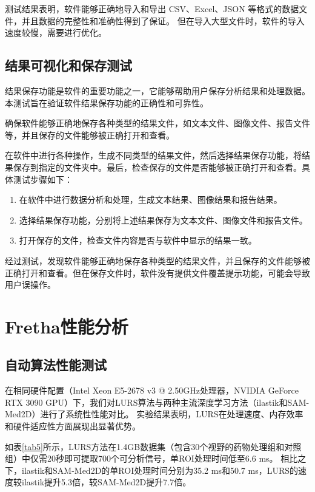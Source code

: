 测试结果表明，软件能够正确地导入和导出 CSV、Excel、JSON 等格式的数据文件，并且数据的完整性和准确性得到了保证。
但在导入大型文件时，软件的导入速度较慢，需要进行优化。

\subsection{结果可视化和保存测试}
结果保存功能是软件的重要功能之一，它能够帮助用户保存分析结果和处理数据。本测试旨在验证软件结果保存功能的正确性和可靠性。

确保软件能够正确地保存各种类型的结果文件，如文本文件、图像文件、报告文件等，并且保存的文件能够被正确打开和查看。

在软件中进行各种操作，生成不同类型的结果文件，然后选择结果保存功能，将结果保存到指定的文件夹中。最后，检查保存的文件是否能够被正确打开和查看。具体测试步骤如下：
\begin{enumerate}
    \item 在软件中进行数据分析和处理，生成文本结果、图像结果和报告结果。
    \item 选择结果保存功能，分别将上述结果保存为文本文件、图像文件和报告文件。
    \item 打开保存的文件，检查文件内容是否与软件中显示的结果一致。
\end{enumerate}

经过测试，发现软件能够正确地保存各种类型的结果文件，并且保存的文件能够被正确打开和查看。但在保存文件时，软件没有提供文件覆盖提示功能，可能会导致用户误操作。

\section{Fretha性能分析}

\subsection{自动算法性能测试}
在相同硬件配置（Intel\textsuperscript{\textregistered} Xeon E5-2678 v3 @ 2.50GHz处理器，NVIDIA\textsuperscript{\textregistered} GeForce RTX 3090 GPU）下，我们对LURS算法与两种主流深度学习方法（ilastik和SAM-Med2D）进行了系统性性能对比。
实验结果表明，LURS在处理速度、内存效率和硬件适应性方面展现出显著优势。  

如表\ref{tab5}所示，LURS方法在1.4GB数据集（包含30个视野的药物处理组和对照组）中仅需20秒即可提取700个可分析信号，单ROI处理时间低至6.6 ms。
相比之下，ilastik和SAM-Med2D的单ROI处理时间分别为35.2 ms和50.7 ms，LURS的速度较ilastik提升5.3倍，较SAM-Med2D提升7.7倍。  

